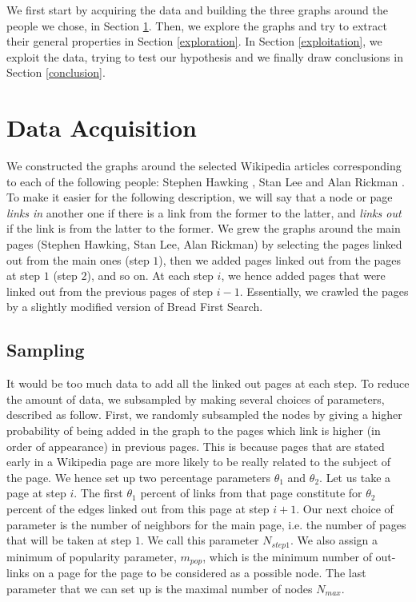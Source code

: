 \documentclass[conference]{IEEEtran}
\begin{document}
\begin{center}

\end{center}

We first start by acquiring the data and building the three graphs around the people we chose, in Section \ref{acquisition}. Then, we explore the graphs and try to extract their general properties in Section \ref{exploration}. In Section \ref{exploitation}, we exploit the data, trying to test our hypothesis and we finally draw conclusions in Section \ref{conclusion}. 

\section{Data Acquisition} \label{acquisition}

We constructed the graphs around the selected Wikipedia articles corresponding to each of the following people: Stephen Hawking \cite{stephenhawking}, Stan Lee \cite{stanlee} and Alan Rickman \cite{alanrickman}. To make it easier for the following description, we will say that a node or page \textit{links in} another one if there is a link from the former to the latter, and \textit{links out} if the link is from the latter to the former. We grew the graphs around the main pages (Stephen Hawking, Stan Lee, Alan Rickman) by selecting the pages linked out from the main ones (step $1$), then we added pages linked out from the pages at step $1$ (step $2$), and so on. At each step $i$, we hence added pages that were linked out from the previous pages of step $i-1$. Essentially, we crawled the pages by a slightly modified version of Bread First Search. 

\subsection{Sampling}
It would be too much data to add all the linked out pages at each step.  To reduce the amount of data, we  subsampled by making several choices of parameters, described as follow. First, we randomly subsampled the nodes by giving a higher probability of being added in the graph to the pages which link is higher (in order of appearance) in previous pages. This is because pages that are stated early in a Wikipedia page are more likely to be really related to the subject of the page. We hence set up two percentage parameters $\theta_1$ and $\theta_2$. Let us take a page at step $i$. The first $\theta_1$ percent of links from that page constitute for $\theta_2$ percent of the edges linked out from this page at step $i+1$. Our next choice of parameter is the number of neighbors for the main page, i.e. the number of pages that will be taken at step $1$. We call this parameter $N_{step1}$. We also assign a minimum of popularity parameter, $m_{pop}$, which is the minimum number of out-links on a page for the page to be considered as a possible node. The last parameter that we can set up is the maximal number of nodes $N_{max}$. 
\end{document}
